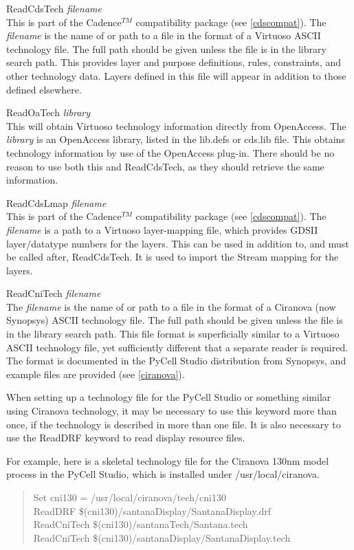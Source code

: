 \begin{description}
\item{\vt ReadCdsTech} {\it filename}\\
This is part of the Cadence$^{TM}$ compatibility package (see
\ref{cdscompat}).  The {\it filename} is the name of or path to a file
in the format of a Virtuoso ASCII technology file.  The full path
should be given unless the file is in the library search path.  This
provides layer and purpose definitions, rules, constraints, and other
technology data.  Layers defined in this file will appear in addition
to those defined elsewhere.

\item{\vt ReadOaTech} {\it library}\\
This will obtain Virtuoso technology information directly from
OpenAccess.  The {\it library} is an OpenAccess library, listed in
the {\vt lib.defs} or {\vt cds.lib} file.  This obtains technology
information by use of the OpenAccess plug-in.  There should be no
reason to use both this and {\vt ReadCdsTech}, as they should
retrieve the same information.

\item{\vt ReadCdsLmap} {\it filename}\\
This is part of the Cadence$^{TM}$ compatibility package (see
\ref{cdscompat}).  The {\it filename} is a path to a Virtuoso
layer-mapping file, which provides GDSII layer/datatype numbers for
the layers.  This can be used in addition to, and must be called
after, {\vt ReadCdsTech}.  It is used to import the Stream mapping
for the layers.

\item{\vt ReadCniTech} {\it filename}\\
The {\it filename} is the name of or path to a file in the format
of a Ciranova (now Synopsys) ASCII technology file.  The full path
should be given unless the file is in the library
search path.  This file format is
superficially similar to a Virtuoso ASCII technology file, yet
sufficiently different that a separate reader is required.  The
format is documented in the PyCell Studio distribution from
Synopsys, and example files are provided (see \ref{ciranova}).

When setting up a technology file for the PyCell Studio or something
similar using Ciranova technology, it may be necessary to use this
keyword more than once, if the technology is described in more than
one file.  It is also necessary to use the {\vt ReadDRF} keyword to
read display resource files.

For example, here is a skeletal technology file for the Ciranova
130nm model process in the PyCell Studio, which is installed under
{\vt /usr/local/ciranova}.

\begin{quote} \vt
Set cni130 = /usr/local/ciranova/tech/cni130\\
ReadDRF \$(cni130)/santanaDisplay/SantanaDisplay.drf\\
ReadCniTech \$(cni130)/santanaTech/Santana.tech\\
ReadCniTech \$(cni130)/santanaDisplay/SantanaDisplay.tech
\end{quote}
\end{description}


